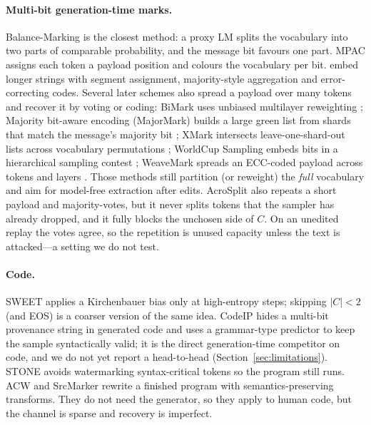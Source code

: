 \documentclass[11pt]{article}
\begin{document}
\paragraph{Multi-bit generation-time marks.}
Balance-Marking \citep{wang2024balancemarking} is the closest method: a proxy LM splits the vocabulary into two parts of comparable probability, and the message bit favours one part.
MPAC \citep{yoo2024mpac} assigns each token a payload position and colours the vocabulary per bit.
\citet{qu2025watermark} embed longer strings with segment assignment, majority-style aggregation and error-correcting codes.
Several later schemes also spread a payload over many tokens and recover it by voting or coding: BiMark uses unbiased multilayer reweighting \citep{feng2025bimark}; Majority bit-aware encoding (MajorMark) builds a large green list from shards that match the message's majority bit \citep{xu2025majormark}; XMark intersects leave-one-shard-out lists across vocabulary permutations \citep{xu2026xmark}; WorldCup Sampling embeds bits in a hierarchical sampling contest \citep{wang2026worldcup}; WeaveMark spreads an ECC-coded payload across tokens and layers \citep{park2026weavemark}.
Those methods still partition (or reweight) the \emph{full} vocabulary and aim for model-free extraction after edits.
AcroSplit also repeats a short payload and majority-votes, but it never splits tokens that the sampler has already dropped, and it fully blocks the unchosen side of $C$.
On an unedited replay the votes agree, so the repetition is unused capacity unless the text is attacked---a setting we do not test.

\paragraph{Code.}
SWEET \citep{lee2024sweet} applies a Kirchenbauer bias only at high-entropy steps; skipping $|C|{<}2$ (and EOS) is a coarser version of the same idea.
CodeIP \citep{guan2024codeip} hides a multi-bit provenance string in generated code and uses a grammar-type predictor to keep the sample syntactically valid; it is the direct generation-time competitor on code, and we do not yet report a head-to-head (Section~\ref{sec:limitations}).
STONE \citep{kim2026stone} avoids watermarking syntax-critical tokens so the program still runs.
ACW \citep{li2024acw} and SrcMarker \citep{yang2024srcmarker} rewrite a finished program with semantics-preserving transforms.
They do not need the generator, so they apply to human code, but the channel is sparse and recovery is imperfect.
\end{document}
